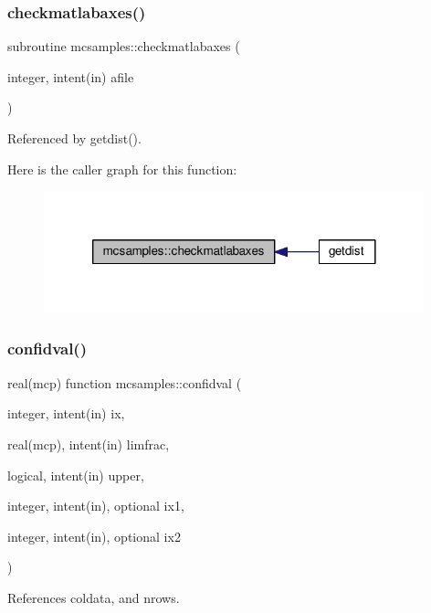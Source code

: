 \subsubsection{\texorpdfstring{checkmatlabaxes()}{checkmatlabaxes()}}
{\footnotesize\ttfamily subroutine mcsamples\+::checkmatlabaxes (\begin{DoxyParamCaption}\item[{integer, intent(in)}]{afile }\end{DoxyParamCaption})}



Referenced by getdist().

Here is the caller graph for this function\+:
\nopagebreak
\begin{figure}[H]
\begin{center}
\leavevmode
\includegraphics[width=312pt]{namespacemcsamples_ad44656764a16d6b3b6acbbab57653252_icgraph}
\end{center}
\end{figure}
\mbox{\label{namespacemcsamples_affe201ec04f01f217a706350334d21e4}} 
\subsubsection{\texorpdfstring{confidval()}{confidval()}}
{\footnotesize\ttfamily real(mcp) function mcsamples\+::confidval (\begin{DoxyParamCaption}\item[{integer, intent(in)}]{ix,  }\item[{real(mcp), intent(in)}]{limfrac,  }\item[{logical, intent(in)}]{upper,  }\item[{integer, intent(in), optional}]{ix1,  }\item[{integer, intent(in), optional}]{ix2 }\end{DoxyParamCaption})}



References coldata, and nrows.



